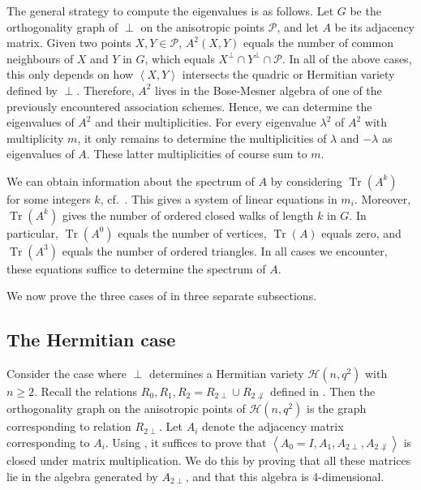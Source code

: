 \documentclass[a4paper]{article}
\theoremstyle{definition}
\newcommand{\vspan}[1]{\left \langle #1 \right \rangle}
\newcommand{\pp}{\mathcal P}
\newcommand{\mh}{\mathcal H}
\DeclareMathOperator{\Tr}{Tr}
\begin{document}
\bigskip

The general strategy to compute the eigenvalues is as follows.
Let $G$ be the orthogonality graph of $\perp$ on the anisotropic points $\pp$, and let $A$ be its adjacency matrix.
Given two points $X,Y \in \pp$, $A^2(X,Y)$ equals the number of common neighbours of $X$ and $Y$ in $G$, which equals $X^\perp \cap Y^\perp \cap \pp$.
In all of the above cases, this only depends on how $\vspan{X,Y}$ intersects the quadric or Hermitian variety defined by $\perp$.
Therefore, $A^2$ lives in the Bose-Mesner algebra of one of the previously encountered association schemes.
Hence, we can determine the eigenvalues of $A^2$ and their multiplicities.
For every eigenvalue $\lambda^2$ of $A^2$ with multiplicity $m$, it only remains to determine the multiplicities of $\lambda$ and $-\lambda$ as eigenvalues of $A$.
These latter multiplicities of course sum to $m$.

We can obtain information about the spectrum of $A$ by considering $\Tr(A^k)$ for some integers $k$, cf.\ .
This gives a system of linear equations in $m_i$.
Moreover, $\Tr(A^k)$ gives the number of ordered closed walks of length $k$ in $G$.
In particular, $\Tr(A^0)$ equals the number of vertices, $\Tr(A)$ equals zero, and $\Tr(A^3)$ equals the number of ordered triangles.
In all cases we encounter, these equations suffice to determine the spectrum of $A$.

We now prove the three cases of  in three separate subsections.

\subsection{The Hermitian case}
 \label{SecHerm}

Consider the case where $\perp$ determines a Hermitian variety $\mh(n,q^2)$ with $n \geq 2$.
Recall the relations $R_0, R_1, R_2 = R_{2\perp} \cup R_{2\not\perp}$ defined in .
Then the orthogonality graph on the anisotropic points of $\mh(n,q^2)$ is the graph corresponding to relation $R_{2\perp}$.
Let $A_i$ denote the adjacency matrix corresponding to $A_i$.
Using , it suffices to prove that $\vspan{A_0=I,A_1,A_{2\perp},A_{2\not\perp}}$ is closed under matrix multiplication.
We do this by proving that all these matrices lie in the algebra generated by $A_{2\perp}$, and that this algebra is 4-dimensional.
\end{document}
